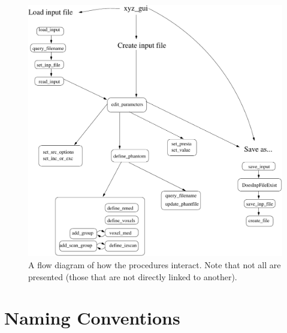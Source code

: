 \documentclass[12pt]{book}
\begin{document}
\begin{figure}[hp]
\includegraphics[width=16.5cm]{figures/flow_xyz}
\caption{A flow diagram of how the procedures interact.  Note that not
all are presented (those that are not directly linked to another).
\label{flowfig}}
\end{figure}

\section{Naming Conventions}
\end{document}
